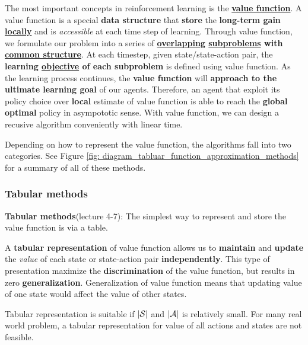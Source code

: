 \documentclass[11pt]{article}
\begin{document}
The most important concepts in reinforcement learning is the \underline{\textbf{value function}}. A value function is a special \textbf{data structure} that \textbf{store} the \textbf{long-term gain} \underline{\textbf{locally}} and is \emph{accessible} at each time step of learning. Through value function, we formulate our problem into a series of \textbf{\underline{overlapping} \underline{subproblems} with \underline{common structure}}. At each timestep, given state/state-action pair, the \textbf{learning \underline{objective} of each subproblem} is defined using value function.  As the learning process continues, the \textbf{value function} will \textbf{approach to the ultimate learning goal} of our agents.  Therefore, an agent that exploit its policy choice over \textbf{local} estimate of value function is able to reach the \textbf{global optimal} policy in asympototic sense. With value function, we can design a recusive algorithm conveniently with linear time. 

Depending on how to represent the value function, the algorithms fall into two categories. See Figure \ref{fig: diagram_tabluar_function_approximation_methods} for a summary of all of these methods. 
\subsubsection{Tabular methods}
\textbf{Tabular methods}(lecture 4-7): The simplest way to represent and store the value function is via a table.  

A \textbf{tabular representation} of value function allows us to \textbf{maintain} and \textbf{update} the \emph{value} of each state or state-action pair \textbf{independently}. This type of presentation maximize the \textbf{discrimination} of the value function, but results in zero \textbf{generalization}. Generalization of value function means that updating value of one state would affect the value of other states. 

Tabular representation is suitable if $|{\mathcal S}|$ and $|{\mathcal A}|$ is relatively small. For many real world problem, a tabular representation for value of all actions and states are not feasible. 
\end{document}
